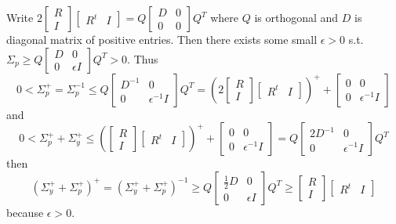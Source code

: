 \documentclass[11pt]{article}
\begin{document}
     Write $2 \begin{bmatrix} R \\ I\end{bmatrix} \begin{bmatrix} R^t & I\end{bmatrix} = Q \begin{bmatrix} D & 0 \\ 0 & 0\end{bmatrix} Q^T $ where $Q$ is orthogonal and $D$ is diagonal matrix of positive entries. Then there exists some small $\epsilon > 0$ s.t. $\Sigma_p \geq  Q \begin{bmatrix} D & 0 \\ 0 & \epsilon I\end{bmatrix} Q^T > 0.$ Thus $$0 < \Sigma_p^{+} = \Sigma_p^{-1} \leq Q \begin{bmatrix} D^{-1} & 0 \\ 0 & \epsilon^{-1} I\end{bmatrix} Q^T= (2\begin{bmatrix} R \\ I\end{bmatrix} \begin{bmatrix} R^t & I\end{bmatrix})^{+} + \begin{bmatrix} 0 & 0 \\ 0 & \epsilon^{-1} I\end{bmatrix} $$ and $$ 0 < \Sigma_p^{+} + \Sigma_y^{+} \leq (\begin{bmatrix} R \\ I\end{bmatrix} \begin{bmatrix} R^t & I\end{bmatrix})^{+} +  \begin{bmatrix} 0 & 0 \\ 0 & \epsilon^{-1} I\end{bmatrix} =  Q \begin{bmatrix} 2 D^{-1} & 0 \\ 0 & \epsilon^{-1} I\end{bmatrix} Q^T$$
     then $$ (\Sigma_y^{+} + \Sigma_p^{+})^{+} = (\Sigma_y^{+} + \Sigma_p^{+})^{-1} \geq Q \begin{bmatrix} \frac{1}{2}D & 0 \\ 0 & \epsilon I \end{bmatrix} Q^T \geq \begin{bmatrix} R \\ I\end{bmatrix} \begin{bmatrix} R^t & I\end{bmatrix} $$
     because $\epsilon > 0.$
 \medskip
 
\printbibliography    
\end{document}

